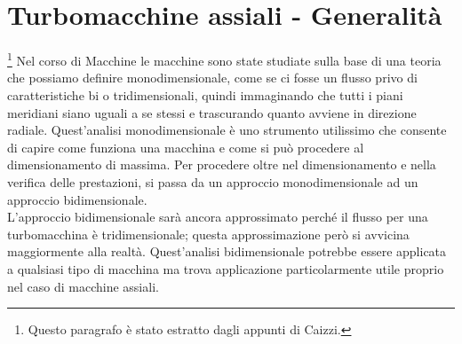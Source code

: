 \chapter{Turbomacchine assiali - Generalità}
\footnote{Questo paragrafo è stato estratto dagli appunti di Caizzi.} Nel corso di Macchine le macchine sono state studiate sulla base di una teoria che possiamo definire monodimensionale, come se ci fosse un flusso privo di caratteristiche bi o tridimensionali, quindi immaginando che tutti i piani meridiani siano uguali a se stessi e trascurando quanto avviene in direzione radiale. Quest'analisi monodimensionale è uno strumento utilissimo che consente di capire come funziona una macchina e come si può procedere al dimensionamento di massima. Per procedere oltre nel dimensionamento e nella verifica delle prestazioni, si passa da un approccio monodimensionale ad un approccio bidimensionale.\\
L’approccio bidimensionale sarà ancora approssimato perché il flusso per una turbomacchina è tridimensionale; questa approssimazione però si avvicina maggiormente alla realtà. Quest'analisi bidimensionale potrebbe essere applicata a qualsiasi tipo di macchina ma trova applicazione particolarmente utile proprio nel caso di macchine assiali.

